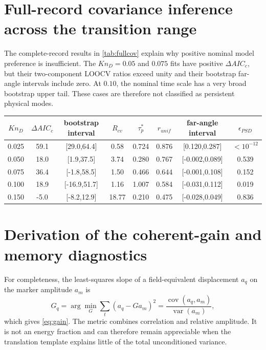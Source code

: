 \documentclass[paper]{JFM-FLM_Au}
\newcommand{\KnD}{Kn_D}
\begin{document}
\section{Full-record covariance inference across the transition range}
The complete-record results in \cref{tab:fullcov} explain why positive nominal model preference is insufficient. The $\KnD=0.05$ and $0.075$ fits have positive $\Delta AIC_c$, but their two-component LOOCV ratios exceed unity and their bootstrap far-angle intervals include zero. At $0.10$, the nominal time scale has a very broad bootstrap upper tail. These cases are therefore not classified as persistent physical modes.

\begin{center}
\label{tab:fullcov}
\scriptsize
\begin{tabular}{cccccccc}
\toprule
$\KnD$ & $\Delta AIC_c$ & bootstrap interval & $R_{cv}$ & $\tau_p^*$ & $r_{unif}$ & far-angle interval & $\epsilon_{PSD}$\\
\midrule
0.025 & 59.1 & [29.0,64.4] & 0.58 & 0.724 & 0.876 & [0.120,0.287] & $<10^{-12}$\\
0.050 & 18.0 & [1.9,37.5] & 3.74 & 0.280 & 0.767 & [-0.002,0.089] & 0.539\\
0.075 & 36.4 & [-1.8,58.5] & 1.50 & 0.466 & 0.644 & [-0.001,0.108] & 0.152\\
0.100 & 18.9 & [-16.9,51.7] & 1.16 & 1.007 & 0.584 & [-0.031,0.112] & 0.019\\
0.150 & -5.0 & [-8.2,12.9] & 18.77 & 0.210 & 0.475 & [-0.028,0.049] & 0.836\\
\bottomrule
\end{tabular}
\end{center}

\section{Derivation of the coherent-gain and memory diagnostics}
For completeness, the least-squares slope of a field-equivalent displacement $a_q$ on the marker amplitude $a_m$ is
\begin{equation}
 \widehat G_q=\arg\min_G\sum_t(a_q-Ga_m)^2
 =\frac{\operatorname{cov}(a_q,a_m)}{\operatorname{var}(a_m)},
\end{equation}
which gives \cref{eq:gain}. The metric combines correlation and relative amplitude. It is not an energy fraction and can therefore remain appreciable when the translation template explains little of the total unconditioned variance.
\end{document}
